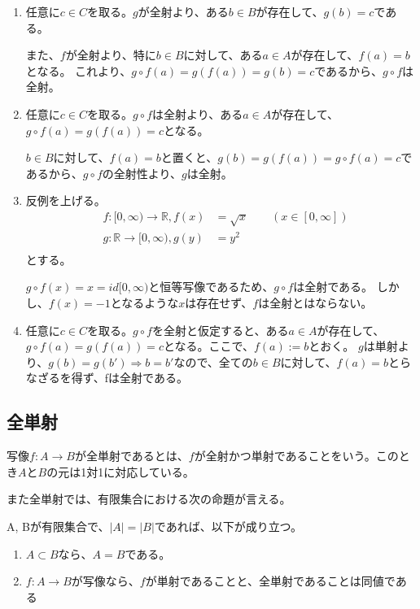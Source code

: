 \documentclass[dvipdfmx,autodetect-engine]{jsarticle}
\begin{document}
\begin{enumerate}
\renewcommand{\labelenumi}{(\arabic{enumi})}
	\item 任意に$c \in C$を取る。$g$が全射より、ある$b \in B$が存在して、$g(b) = c$である。
	
	また、$f$が全射より、特に$b \in B$に対して、ある$a \in A$が存在して、$f(a) = b$となる。
	これより、$g \circ f(a) = g(f(a)) = g(b) = c$であるから、$g \circ f$は全射。
	
	\item 任意に$c \in C$を取る。$g \circ f$は全射より、ある$a \in A$が存在して、$g \circ f(a) = g(f(a)) = c$となる。
	
	$b \in B$に対して、$f(a) = b$と置くと、$g(b) = g(f(a)) = g \circ f(a) = c$であるから、$g \circ f$の全射性より、$g$は全射。
	
    \item 反例を上げる。
    \begin{eqnarray*}
    &f:[0,∞) \to \mathbb{R}, f(x) &= \sqrt{x} \quad \quad (x \in [0,∞]) \\
    &g:\mathbb{R} \to [0, ∞), g(y) &= y^2 \\
    \end{eqnarray*}
    とする。
    
    $g \circ f(x) = x = id[0,∞)$と恒等写像であるため、$g \circ f$は全射である。
    しかし、$f(x) = −1$となるような$x$は存在せず、$f$は全射とはならない。
	
	\item 任意に$c \in C$を取る。$g \circ f$を全射と仮定すると、ある$a \in A$が存在して、$g \circ f(a) = g(f(a)) = c$となる。ここで、$f(a) := b$とおく。
	$g$は単射より、$g(b) = g(b') \Rightarrow b = b'$なので、全ての$b \in B$に対して、$f(a) = b$とらなざるを得ず、fは全射である。
\end{enumerate}


\subsection{全単射}

写像$f: A \to B$が全単射であるとは、$f$が全射かつ単射であることをいう。このとき$A$と$B$の元は1対1に対応している。

また全単射では、有限集合における次の命題が言える。

\prop

A, Bが有限集合で、$|A| = |B|$であれば、以下が成り立つ。
\begin{enumerate}
\renewcommand{\labelenumi}{(\arabic{enumi})}
\item $A \subset B$なら、$A = B$である。
\item $f: A \to B$が写像なら、$f$が単射であることと、全単射であることは同値である
\end{enumerate}
\end{document}
